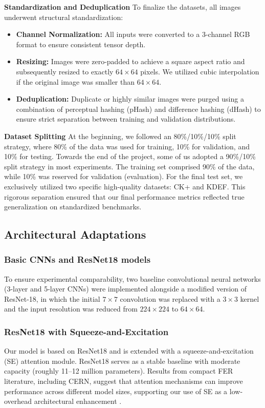 \textbf{Standardization and Deduplication}
To finalize the datasets, all images underwent structural standardization:
\begin{itemize}
    \item \textbf{Channel Normalization:} All inputs were converted to a 3-channel RGB format to ensure consistent tensor depth.
    \item \textbf{Resizing:} Images were zero-padded to achieve a square aspect ratio and subsequently resized to exactly $64 \times 64$ pixels. We utilized cubic interpolation if the original image was smaller than $64 \times 64$.
    \item \textbf{Deduplication:} Duplicate or highly similar images were purged using a combination of perceptual hashing (pHash) and difference hashing (dHash) to ensure strict separation between training and validation distributions.
\end{itemize}

\textbf{Dataset Splitting}
At the beginning, we followed an 80\%/10\%/10\% split strategy, where 80\% of the data was used for training, 10\% for validation, and 10\% for testing.
Towards the end of the project, some of us adopted a 90\%/10\% split strategy in most experiments. The training set comprised 90\% of the data, while 10\% was reserved for validation (evaluation). For the final test set, we exclusively utilized two specific high-quality datasets: CK+ and KDEF. This rigorous separation ensured that our final performance metrics reflected true generalization on standardized benchmarks.

\subsection{Architectural Adaptations}

\subsubsection{Basic CNNs and ResNet18 models}
To ensure experimental comparability, two baseline convolutional neural networks (3-layer and 5-layer CNNs) were implemented alongside a modified version of ResNet-18, in which the initial $7 \times 7$ convolution was replaced with a $3 \times 3$ kernel and the input resolution was reduced from $224 \times 224$ to $64 \times 64$. 

\subsubsection{ResNet18 with Squeeze-and-Excitation}
Our model is based on ResNet18 and is extended with a squeeze-and-excitation (SE) attention module. ResNet18 serves as a stable baseline with moderate capacity (roughly 11--12 million parameters). Results from compact FER literature, including CERN, suggest that attention mechanisms can improve performance across different model sizes, supporting our use of SE as a low-overhead architectural enhancement \cite{GERA20229}.

